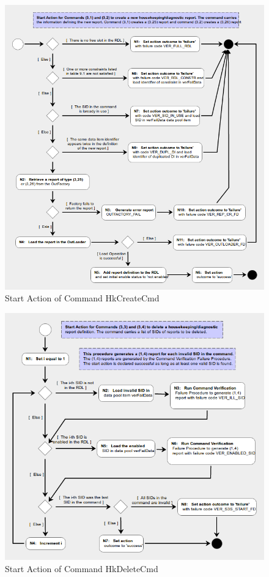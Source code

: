 \documentclass[a4paper,10pt]{article}
\begin{document}
\begin{figure}[H]
 \centering
 \includegraphics[scale=0.55,keepaspectratio=true]{CrPsCmd3s1Start.png}
 \caption{Start Action of Command HkCreateCmd}
 \label{fig:Cmd3s1Start}
\end{figure}

\begin{figure}[H]
 \centering
 \includegraphics[scale=0.55,keepaspectratio=true]{CrPsCmd3s3Start.png}
 \caption{Start Action of Command HkDeleteCmd}
 \label{fig:Cmd3s3Start}
\end{figure}
\end{document}
